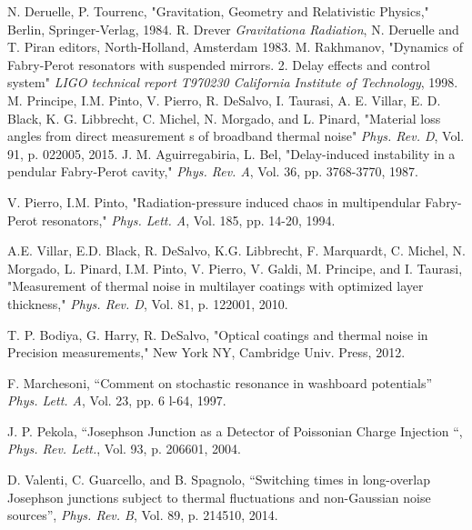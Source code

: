 \documentclass[conference]{IEEEtran}
\begin{document}
\begin{thebibliography}{99}

 N. Deruelle, P. Tourrenc,  "Gravitation, Geometry and Relativistic Physics," Berlin, Springer-Verlag, 1984.
 R. Drever {\it Gravitationa Radiation}, {N. Deruelle and   T. Piran editors,} {North-Holland, Amsterdam} {1983}.
 M. Rakhmanov, "Dynamics of Fabry-Perot resonators with suspended mirrors. 2. Delay effects and control system" 
{\it LIGO technical report T970230 California Institute of Technology}, {1998}.
 M. Principe, I.M. Pinto, V. Pierro, R. DeSalvo, I. Taurasi, A. E. Villar, E. D. Black,  K. G. Libbrecht, C. Michel, N. Morgado,  and L. Pinard, 
"Material loss angles from direct measurement s of broadband thermal noise"  
{\it Phys. Rev. D}, Vol.  91, p. 022005, 2015.
   J. M.  Aguirregabiria, L. Bel, "Delay-induced instability in a pendular Fabry-Perot cavity," 
{\it Phys. Rev. A}, Vol. 36, pp. 3768-3770, 1987.

 V. Pierro, I.M. Pinto, "Radiation-pressure induced chaos in multipendular Fabry-Perot resonators," 
{\it Phys. Lett. A}, Vol. 185, pp. 14-20, 1994.



 A.E. Villar, E.D. Black, R. DeSalvo, K.G. Libbrecht, F. Marquardt, C. Michel, N. Morgado, L. Pinard,  I.M. Pinto, V. Pierro, V. Galdi,
 M. Principe, and I. Taurasi, "Measurement of thermal noise in multilayer coatings with optimized layer thickness," 
 {\it Phys. Rev. D}, {Vol. 81}, p. 122001, 2010.

 T. P. Bodiya, G. Harry, R. DeSalvo, "Optical coatings and thermal noise in Precision measurements," New York NY, Cambridge Univ. Press, 2012.

F. Marchesoni, ``Comment on stochastic resonance in washboard potentials'' {\it Phys. Lett. A},  Vol. 23,  pp.  6 l-64,  1997.

 J. P. Pekola, ``Josephson Junction as a Detector of Poissonian Charge Injection ``, {\it  Phys. Rev. Lett.}, Vol. 93, p. 206601,  2004.

 D. Valenti, C. Guarcello, and B. Spagnolo, ``Switching times in long-overlap Josephson junctions subject to thermal fluctuations and non-Gaussian noise sources'', {\it Phys. Rev. B}, Vol.  89, p. 214510, 2014.



\end{thebibliography}
\end{document}
